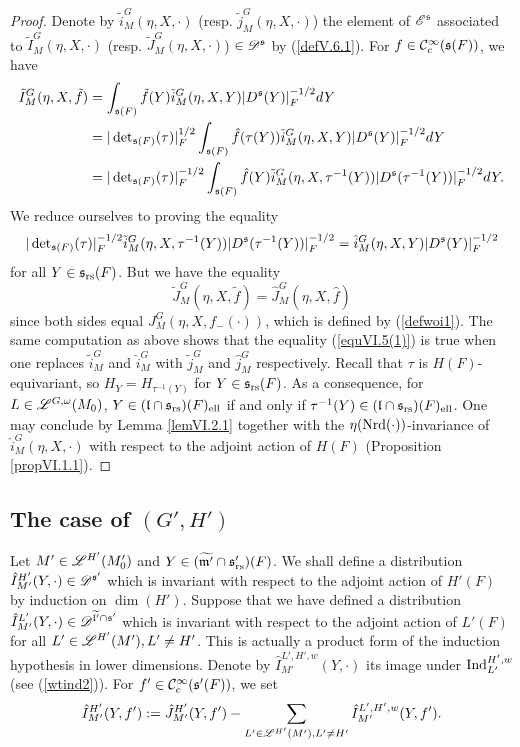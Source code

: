 \documentclass[a4paper]{amsart}
\newcommand{\mse}{\mathscr{E}}\newcommand{\msf}{\mathscr{F}}\newcommand{\msg}{\mathscr{G}}\newcommand{\msh}{\mathscr{H}}
\newcommand{\fm}{{\mathfrak{m}}} \newcommand{\fn}{{\mathfrak{n}}}\newcommand{\fo}{{\mathfrak{o}}} \newcommand{\fp}{{\mathfrak{p}}}
\newcommand{\wt}{\widetilde}                        \newcommand{\wh}{\widehat}                      \newcommand{\wpair}[1]{\left\{{#1}\right\}}
\theoremstyle{definition}
\theoremstyle{remark}
\numberwithin{equation}{subsection}
\begin{document}
\begin{proof}
Denote by $\tilde{i}_M^G(\eta, X, \cdot)$ (resp. $\tilde{j}_M^G(\eta, X, \cdot)$) the element of $\mse^\fs$ associated to $\tilde{I}_M^G(\eta, X, \cdot)$ (resp. $\tilde{J}_M^G(\eta, X, \cdot)$) $\in\mathscr{D}^{\mathfrak{s}}$ by (\ref{defV.6.1}). For $f\in{\mathcal {C}}_c^\infty({\mathfrak{s}}(F))$, we have
\[\begin{split}
 \tilde{I}_M^G(\eta, X, \tilde{f})&=\int_{{\mathfrak{s}}(F)} \tilde{f}(Y) \tilde{i}_M^G(\eta, X, Y) |D^{\mathfrak{s}}(Y)|_F^{-1/2} dY \\
&=|\det\nolimits_{{\mathfrak{s}}(F)}(\tau)|_F^{1/2}\int_{{\mathfrak{s}}(F)} \hat{f}(\tau(Y)) \tilde{i}_M^G(\eta, X, Y) |D^{\mathfrak{s}}(Y)|_F^{-1/2} dY \\
&=|\det\nolimits_{{\mathfrak{s}}(F)}(\tau)|_F^{-1/2}\int_{{\mathfrak{s}}(F)} \hat{f}(Y) \tilde{i}_M^G(\eta, X, \tau^{-1}(Y)) |D^{\mathfrak{s}}(\tau^{-1}(Y))|_F^{-1/2} dY. 
\end{split}\]
We reduce ourselves to proving the equality
\begin{equation}\label{equVI.5(1)}
|\det\nolimits_{{\mathfrak{s}}(F)}(\tau)|_F^{-1/2} \tilde{i}_M^G(\eta, X, \tau^{-1}(Y)) |D^{\mathfrak{s}}(\tau^{-1}(Y))|_F^{-1/2}=\hat{i}_M^G(\eta, X, Y) |D^{\mathfrak{s}}(Y)|_F^{-1/2}
\end{equation}
for all $Y\in{\mathfrak{s}}_{\mathrm{rs}}(F)$. But we have the equality
$$ \tilde{J}_M^G(\eta, X, \tilde{f})=\hat{J}_M^G(\eta, X, \hat{f}) $$
since both sides equal $J_M^G(\eta, X, f_{-}(\cdot))$, which is defined by (\ref{defwoi1}). The same computation as above shows that the equality (\ref{equVI.5(1)}) is true when one replaces $\tilde{i}_M^G$ and $\hat{i}_M^G$ with $\tilde{j}_M^G$ and $\hat{j}_M^G$ respectively. Recall that $\tau$ is $H(F)$-equivariant, so $H_Y=H_{\tau^{-1}(Y)}$ for $Y\in{\mathfrak{s}}_{\mathrm{rs}}(F)$. As a consequence, for $L\in\mathscr{L}^{G,\omega}(M_0)$, $Y\in({\mathfrak{l}}\cap{\mathfrak{s}}_{\mathrm{rs}})(F)_{\mathrm{ell}}$ if and only if $\tau^{-1}(Y)\in({\mathfrak{l}}\cap{\mathfrak{s}}_{\mathrm{rs}})(F)_{\mathrm{ell}}$. One may conclude by Lemma \ref{lemVI.2.1} together with the $\eta({\mathrm{Nrd}}(\cdot))$-invariance of $\hat{i}_M^G(\eta, X, \cdot)$ with respect to the adjoint action of $H(F)$ (Proposition \ref{propVI.1.1}). 
\end{proof}

\subsection{The case of $(G',H')$}\label{sectinvwoi2}

Let $M'\in\mathscr{L}^{H'}(M'_0)$ and $Y\in(\wt{\fm'}\cap\fs'_\rs)(F)$. We shall define a distribution $\hat{I}_{M'}^{H'}(Y, \cdot)\in\mathscr{D}^{{\mathfrak{s}}'}$ which is invariant with respect to the adjoint action of $H'(F)$ by induction on $\dim(H')$. Suppose that we have defined a distribution $\hat{I}_{M'}^{L'}(Y, \cdot)\in\msd^{\wt{\fl'}\cap\fs'}$ which is invariant with respect to the adjoint action of $L'(F)$ for all $L'\in\mathscr{L}^{H'}(M'), L'\neq H'$. This is actually a product form of the induction hypothesis in lower dimensions. Denote by $\hat{I}_{M'}^{L',H',w}(Y, \cdot)$ its image under ${\mathrm{Ind}}_{L'}^{H', w}$ (see (\ref{wtind2})). For $f'\in{\mathcal {C}}_c^\infty({\mathfrak{s}}'(F))$, we set
\begin{equation}\label{invftofwoi2}
 \hat{I}_{M'}^{H'}(Y, f'):=\hat{J}_{M'}^{H'}(Y, f')-\sum_{L'\in\mathscr{L}^{H'}(M'), L'\neq H'} \hat{I}_{M'}^{L',H',w}(Y, f'). 
\end{equation}
\end{document}
